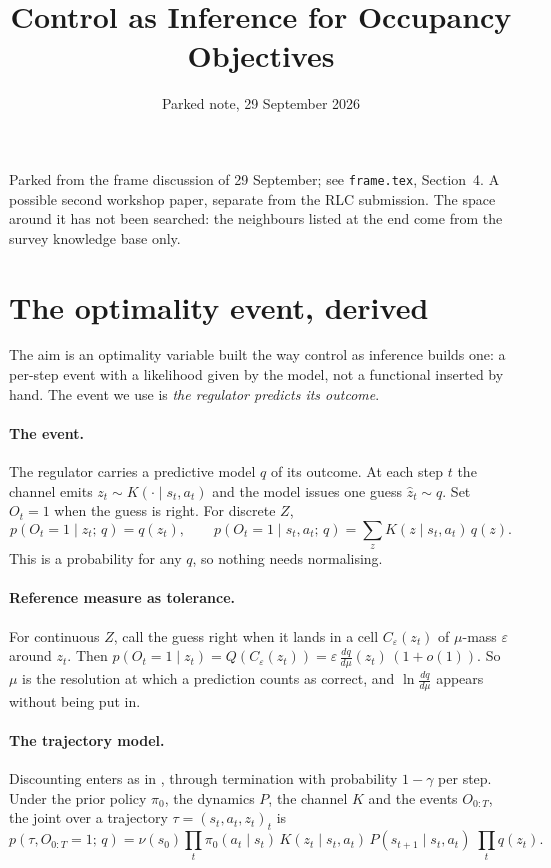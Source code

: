 \documentclass[10pt]{article}
\title{Control as Inference for Occupancy Objectives}
\author{Parked note, 29 September 2026}
\date{}
\begin{document}
\maketitle
\thispagestyle{fancy}

\noindent
Parked from the frame discussion of 29 September; see \texttt{frame.tex}, Section~4. A possible second workshop paper, separate from the RLC submission. The space around it has not been searched: the neighbours listed at the end come from the survey knowledge base only.

\section{The optimality event, derived}

The aim is an optimality variable built the way control as inference builds one: a per-step event with a likelihood given by the model, not a functional inserted by hand. The event we use is \emph{the regulator predicts its outcome}.

\paragraph{The event.} The regulator carries a predictive model $q$ of its outcome. At each step $t$ the channel emits $z_t \sim K(\cdot \mid s_t,a_t)$ and the model issues one guess $\hat z_t \sim q$. Set $O_t = 1$ when the guess is right. For discrete $Z$,
\begin{equation}
  p(O_t = 1 \mid z_t;\, q) = q(z_t), \qquad
  p(O_t = 1 \mid s_t,a_t;\, q) = \sum_z K(z \mid s_t,a_t)\, q(z).
  \label{eq:event}
\end{equation}
This is a probability for any $q$, so nothing needs normalising.

\paragraph{Reference measure as tolerance.} For continuous $Z$, call the guess right when it lands in a cell $C_\varepsilon(z_t)$ of $\mu$-mass $\varepsilon$ around $z_t$. Then $p(O_t=1\mid z_t) = Q(C_\varepsilon(z_t)) = \varepsilon\,\frac{dq}{d\mu}(z_t)\,(1+o(1))$. So $\mu$ is the resolution at which a prediction counts as correct, and $\ln \frac{dq}{d\mu}$ appears without being put in.

\paragraph{The trajectory model.} Discounting enters as in \citet{Levine-reinforcement18}, through termination with probability $1-\gamma$ per step. Under the prior policy $\pi_0$, the dynamics $P$, the channel $K$ and the events $O_{0:T}$, the joint over a trajectory $\tau = (s_t,a_t,z_t)_t$ is
\begin{equation}
  p(\tau, O_{0:T}=1;\, q) = \nu(s_0) \prod_t \pi_0(a_t\mid s_t)\, K(z_t\mid s_t,a_t)\, P(s_{t+1}\mid s_t,a_t)\; \prod_t q(z_t).
\end{equation}
\end{document}
